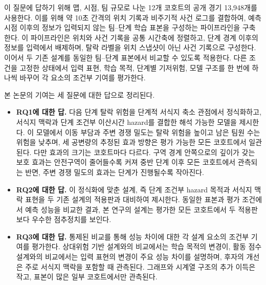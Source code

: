 이 질문에 답하기 위해 맵, 시점, 팀 규모로 나눈 12개 코호트의 공개 경기 13,948개를 사용한다.
이를 위해 약 10초 간격의 위치 기록과 비주기적 사건 로그를 결합하여, 예측 시점 이후의 정보가 입력되지 않는 팀--단계 학습 표본을 구성하는 파이프라인을 구축한다.
이 파이프라인은 위치와 사건 기록을 공통 시간축에 정렬하고, 단계 경계 이후의 정보를 입력에서 배제하며, 탈락 라벨을 위치 스냅샷이 아닌 사건 기록으로 구성한다.
이어서 두 기존 설계를 동일한 팀--단계 표본에서 비교할 수 있도록 적용한다.
다른 조건을 고정한 상태에서 입력 표현, 학습 목적, 단계별 기저위험, 모델 구조를 한 번에 하나씩 바꾸어 각 요소의 조건부 기여를 평가한다.

본 논문의 기여는 세 질문에 대한 답으로 정리된다.
\begin{itemize}
    \item \textbf{RQ1에 대한 답.}
    다음 단계 탈락 위험을 단계적 서식지 축소 관점에서 정식화하고, 서식지 맥락과 단계 조건부 이산시간 hazard를 결합한 해석 가능한 모델을 제시한다.
    이 모델에서 이동 부담과 주변 경쟁 밀도는 탈락 위험을 높이고 남은 팀원 수는 위험을 낮추며, 세 공변량의 추정된 효과 방향은 평가 가능한 모든 코호트에서 일관된다.
    다만 효과의 크기는 코호트마다 다르다.
    구역 경계 안쪽으로의 깊이가 갖는 보호 효과는 안전구역이 줄어들수록 커져 중반 단계 이후 모든 코호트에서 관측되는 반면, 주변 경쟁 밀도의 효과는 단계가 진행될수록 작아진다.

    \item \textbf{RQ2에 대한 답.}
    이 정식화에 맞춘 설계, 즉 단계 조건부 hazard 목적과 서식지 맥락 표현을 두 기존 설계의 적용판과 대비하여 제시한다.
    동일한 표본과 평가 조건에서 예측 성능을 비교한 결과, 본 연구의 설계는 평가한 모든 코호트에서 두 적용판보다 우수한 점추정치를 보인다.

    \item \textbf{RQ3에 대한 답.}
    통제된 비교를 통해 성능 차이에 대한 각 설계 요소의 조건부 기여를 평가한다.
    상대위험 기반 설계와의 비교에서는 학습 목적의 변경이, 활동 점수 설계와의 비교에서는 입력 표현의 변경이 주요 성능 차이를 설명하며, 후자의 개선은 주로 서식지 맥락을 포함할 때 관측된다.
    그래프와 시계열 구조의 추가 이득은 작고, 표본이 많은 일부 코호트에서만 관측된다.
\end{itemize}
